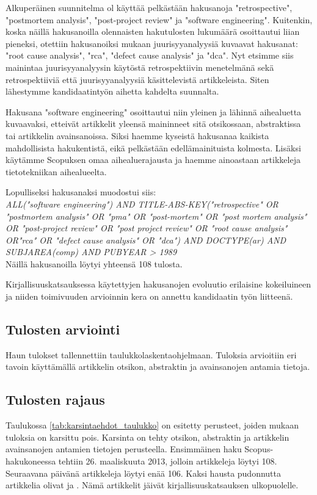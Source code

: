 Alkuperäinen suunnitelma ol käyttää pelkästään hakusanoja "retrospective",  "postmortem analysis", "post-project review" ja "software engineering". Kuitenkin, koska näillä hakusanoilla olennaisten hakutulosten lukumäärä osoittautui liian pieneksi, otettiin hakusanoiksi mukaan juurisyyanalyysiä kuvaavat hakusanat: "root cause analysis", "rca", "defect cause analysis" ja "dca". Nyt etsimme siis mainintaa juurisyyanalyysin käytöstä retrospektiivin menetelmänä sekä retrospektiiviä että juurisyyanalyysiä käsittelevistä artikkeleista. Siten lähestymme kandidaatintyön aihetta kahdelta suunnalta.

Hakusana "software engineering" osoittautui niin yleinen ja lähinnä aihealuetta kuvaavaksi, etteivät artikkelit yleensä maininneet sitä otsikossaan, abstraktissa tai artikkelin avainsanoissa. Siksi haemme kyseistä hakusanaa kaikista mahdollisista hakukentistä, eikä pelkästään edellämainituista kolmesta. Lisäksi käytämme Scopuksen omaa aihealuerajausta ja haemme ainoastaan artikkeleja tietotekniikan aihealueelta.

Lopulliseksi hakusanaksi muodostui siis:\\
\textit{ALL("software engineering") AND TITLE-ABS-KEY("retrospective" OR "postmortem analysis" OR "pma" OR "post-mortem" OR "post mortem analysis" OR "post-project review" OR "post project review" OR "root cause analysis" OR"rca" OR "defect cause analysis" OR "dca") AND DOCTYPE(ar) AND SUBJAREA(comp) AND PUBYEAR > 1989}\\
Näillä hakusanoilla löytyi yhteensä 108 tulosta.

Kirjallisuuskatsauksessa käytettyjen hakusanojen evoluutio erilaisine kokeiluineen ja niiden toimivuuden arvioinnin kera on annettu kandidaatin työn liitteenä.

\subsection{Tulosten arviointi}
Haun tulokset tallennettiin taulukkolaskentaohjelmaan. Tuloksia arvioitiin eri tavoin käyttämällä artikkelin otsikon, abstraktin ja avainsanojen antamia tietoja.
\clearpage

\subsection{Tulosten rajaus}
Taulukossa \ref{tab:karsintaehdot_taulukko} on esitetty perusteet, joiden mukaan tuloksia on karsittu pois. Karsinta on tehty otsikon, abstraktin ja artikkelin avainsanojen antamien tietojen perusteella. Ensimmäinen haku Scopus-hakukoneessa tehtiin 26. maaliskuuta 2013, jolloin artikkeleja löytyi 108. Seuraavana päivänä artikkeleja löytyi enää 106. Kaksi hausta pudonnutta artikkelia olivat \citep{bolosky2007farsite} ja \citep{dreiseitl2005nomographic}. Nämä artikkelit jäivät kirjallisuuskatsauksen ulkopuolelle.

